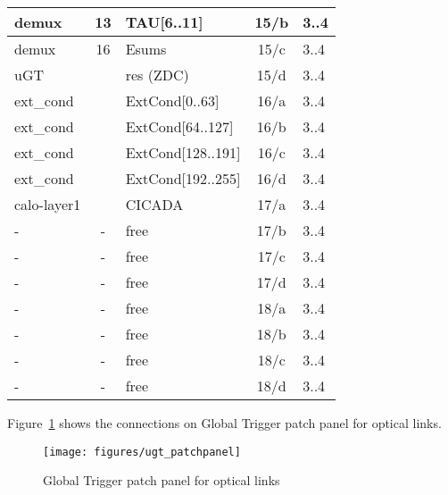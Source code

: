 \begin{longtable}{|l|c|l|c|l|}
demux & 13  & TAU[6..11] & 15/b & 3..4 \\\hline
demux & 16  & Esums      & 15/c & 3..4 \\\hline
uGT   &     & res (ZDC)  & 15/d & 3..4 \\\hline
ext\_cond &     & ExtCond[0..63]    & 16/a & 3..4 \\\hline
ext\_cond &     & ExtCond[64..127]  & 16/b & 3..4 \\\hline
ext\_cond &     & ExtCond[128..191] & 16/c & 3..4 \\\hline
ext\_cond &     & ExtCond[192..255] & 16/d & 3..4 \\\hline
calo-layer1 &   & CICADA & 17/a & 3..4 \\\hline
- & - & free & 17/b & 3..4 \\\hline
- & - & free & 17/c & 3..4 \\\hline
- & - & free & 17/d & 3..4 \\\hline
- & - & free & 18/a & 3..4 \\\hline
- & - & free & 18/b & 3..4 \\\hline
- & - & free & 18/c & 3..4 \\\hline
- & - & free & 18/d & 3..4 \\\hline
\end{longtable}

Figure~\ref{fig:app:ugt_pp} shows the connections on Global Trigger patch panel for optical links.

\begin{figure}[htb]
\centering
\texttt{[image: figures/ugt\_patchpanel]}
\caption{Global Trigger patch panel for optical links}
\label{fig:app:ugt_pp}
\end{figure}

\clearpage
